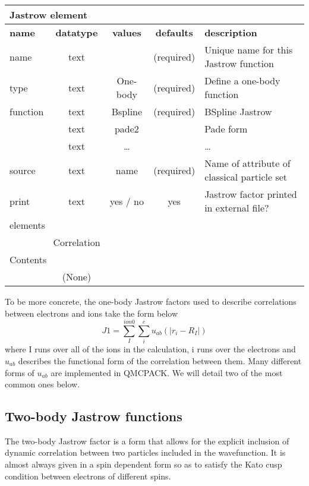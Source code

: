 \begin{table}[h]
\begin{center}
\begin{tabular}{l c c c l }
\hline
\multicolumn{5}{l}{Jastrow element} \\
\hline
\bfseries name & \bfseries datatype & \bfseries values & \bfseries defaults  & \bfseries description \\
\hline
name & text &    & (required) & Unique name for this Jastrow function \\
type & text & One-body & (required) & Define a one-body function \\ 
function & text & Bspline & (required) & BSpline Jastrow \\
             & text & pade2 & & Pade form \\
             & text & \ldots & & \ldots \\
source & text & name & (required) & Name of attribute of classical particle set \\ 
print & text & yes / no & yes & Jastrow factor printed in external file?\\
  \hline
\multicolumn{5}{l}{elements}\\ \hline
& Correlation & & & \\ \hline
\multicolumn{5}{l}{Contents}\\ \hline
& (None)  & & &  \\ \hline
\end{tabular}
\end{center}
\end{table}

To be more concrete, the one-body Jastrow factors used to describe correlations
between electrons and ions take the form below
\begin{equation}
J1=\sum_I^{ion0}\sum_i^e u_{ab}(|r_i-R_I|)
\end{equation}
where I runs over all of the ions in the calculation, i runs over the electrons
and $u_{ab}$ describes the functional form of the correlation between them.
Many different forms of $u_{ab}$ are implemented in QMCPACK.  We will detail 
two of the most common ones below.



\subsection{Two-body Jastrow functions}
The two-body Jastrow factor is a form that allows for the explicit inclusion
of dynamic correlation between two particles included in the wavefunction.  It
is almost always given in a spin dependent form so as to satisfy the Kato cusp
condition between electrons of different spins\cite{kato}.

